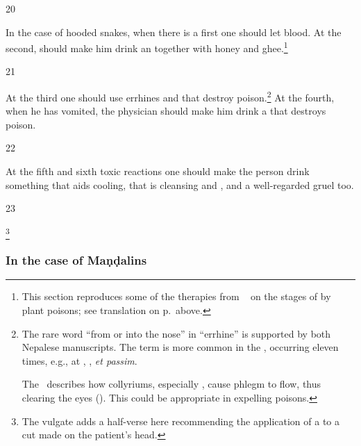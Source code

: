 \begin{translation}
\item [20]

In the case of hooded snakes, when there is a 
first one should let blood.  At the second,  should make him drink an 
 together with honey and ghee.\footnote{This
    section reproduces some of the therapies from  \SS\ 
    on the stages of  by plant poisons; see
    translation on p.\,\pageref{dusivisa} above.}

\item [21]

At the third one should use errhines and  that destroy
poison.\footnote{%
The rare word  “from or
    into the nose” in  “errhine” is supported by both
    Nepalese manuscripts.  The term is more common in the \CS, occurring
    eleven times, e.g., at , , \emph{et
    passim}.  
    
    The \CS\ describes how collyriums, especially , cause
phlegm to flow, thus clearing the eyes ().
This could be appropriate in expelling poisons.} At the fourth, when he
has vomited, the physician should make him drink a 
that destroys poison.

\item [22]

At the fifth and sixth toxic reactions one should make 
the
person drink something that aids cooling, that is cleansing
and , and a well-regarded gruel too.


    
\item [23]

\footnote{The vulgate adds a half-verse here recommending
    the application of a  to a cut made on the patient's 
    head.}


\subsubsection{In the case of Maṇḍalins}


\end{translation}
